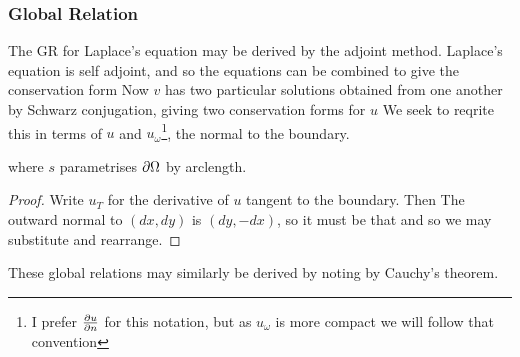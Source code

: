 \documentclass{article}
\begin{document}
\subsubsection{Global Relation}
The GR for Laplace's equation may be derived by the adjoint method. Laplace's equation is self adjoint, and so the equations can be combined to give the conservation form 
Now $v$ has two particular solutions 
obtained from one another by Schwarz conjugation, giving two conservation forms for $u$
We seek to reqrite this in terms of $u$ and $u_\omega$\footnote{I prefer $\pd[u]{n}$ for this notation, but as $u_\omega$ is more compact we will follow that convention}, the normal to the boundary. 
\begin{claim}
where $s$ parametrises $\del \Omega$ by arclength. 
\end{claim}
\begin{proof}
Write $u_T$ for the derivative of $u$ tangent to the boundary. Then 
The outward normal to $(dx, dy)$ is $(dy, -dx)$, so it must be that  
and so we may substitute and rearrange. 
\end{proof}
These global relations may similarly be derived by noting 
by Cauchy's theorem. 

\end{document}
